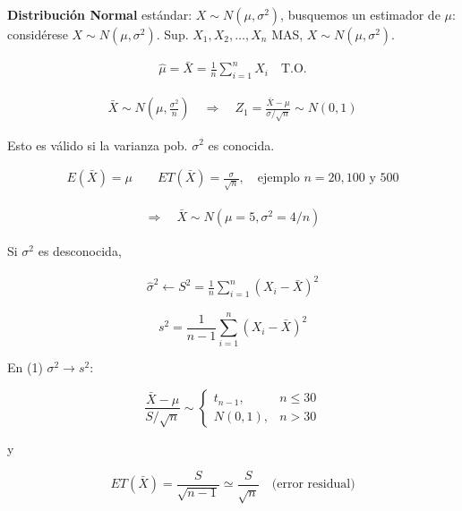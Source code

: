 \begin{Ejem} \textbf{Distribuci\'on Normal} est\'andar: $X\sim N(\mu,\sigma^2)$, busquemos un estimador de $\mu$:
consid\'erese $X \sim N(\mu,\sigma^2)$. Sup. $X_1, X_2, \ldots, X_n$ MAS,
$X \sim N(\mu,\sigma^2)$.

\begin{eqnarray*}
\hat{\mu} = \bar{X} = \frac{1}{n}\sum_{i=1}^n X_i \quad \text{T.O.}
\end{eqnarray*}

\begin{eqnarray*}
\bar{X} \sim N\left(\mu,\frac{\sigma^2}{n}\right)
\quad \Rightarrow \quad
Z_1 = \frac{\bar{X}-\mu}{\sigma/\sqrt{n}} \sim N(0,1)
\end{eqnarray*}

Esto es v\'alido si la varianza pob. $\sigma^2$ es conocida.

\begin{eqnarray*}
E(\bar{X})=\mu
\qquad
ET(\bar{X})=\frac{\sigma}{\sqrt{n}},
\quad \text{ejemplo } n=20,100 \text{ y } 500
\end{eqnarray*}

\begin{eqnarray*}
\Rightarrow \quad \bar{X} \sim N(\mu=5,\sigma^2=4/n)
\end{eqnarray*}

Si $\sigma^2$ es desconocida,

\begin{eqnarray*}
\hat{\sigma}^2 \leftarrow S^2
= \frac{1}{n}\sum_{i=1}^n (X_i-\bar{X})^2
\end{eqnarray*}

\begin{equation}
s^2 = \frac{1}{n-1}\sum_{i=1}^n (X_i-\bar{X})^2
\tag{3}
\end{equation}

En (1) $\sigma^2 \to s^2$:

\begin{equation}
\frac{\bar{X}-\mu}{S/\sqrt{n}}
\sim
\begin{cases}
t_{n-1}, & n \le 30 \\
N(0,1), & n > 30
\end{cases}
\end{equation}

y

\begin{equation}
ET(\bar{X})=\frac{S}{\sqrt{n-1}} \simeq \frac{S}{\sqrt{n}}
\quad \text{(error residual)}
\end{equation}


\end{Ejem}
